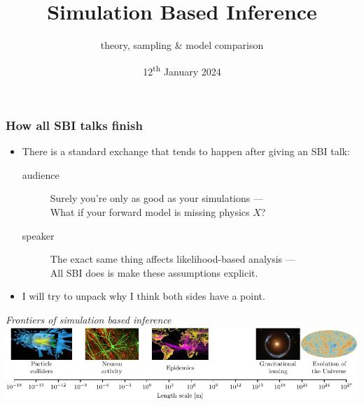 \documentclass[aspectratio=169]{beamer}
\title{Simulation Based Inference}
\subtitle{theory, sampling & model comparison}
\date{12\textsuperscript{th} January 2024}
\begin{document}
\begin{frame}
    \titlepage
\end{frame}

\begin{frame}
    \frametitle{How all SBI talks finish}
    \begin{itemize}
        \item There is a standard exchange that tends to happen after giving an SBI talk:

            \begin{description}
                \item[audience] Surely you're only as good as your simulations ---\\What if your forward model is missing physics $X$?
                \item[speaker] The exact same thing affects likelihood-based analysis ---\\
                    All SBI does is make these assumptions explicit.
            \end{description}
        \item I will try to unpack why I think both sides have a point.
    \end{itemize}
    \vspace{10pt}
\hfill \textit{Frontiers of simulation based inference}~
    \includegraphics[width=\textwidth]{figures/sbi_range.pdf}
\end{frame}
\end{document}
